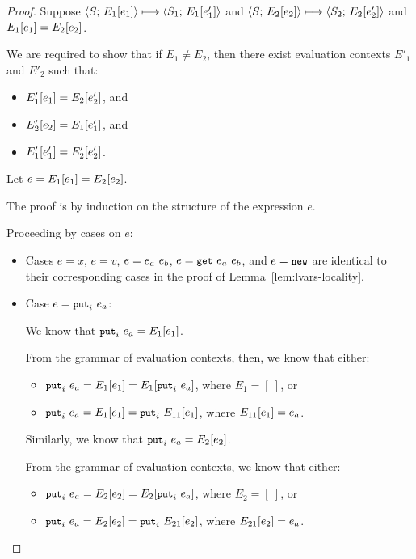 \begin{proof}
  Suppose $\langle S;\, E_1\hspace{-0.5mm}\left[e_1\right] \rangle \longmapsto
  \langle S_1;\, E_1\hspace{-0.5mm}\left[e'_1\right] \rangle$ and
  $\langle S;\, E_2\hspace{-0.5mm}\left[e_2\right] \rangle \longmapsto
  \langle S_2;\, E_2\hspace{-0.5mm}\left[e'_2\right] \rangle$ and $E_1\hspace{-0.5mm}\left[e_1\right] =
  E_2\hspace{-0.5mm}\left[e_2\right]$.

  We are required to show that if $E_1 \neq E_2$, then there exist
  evaluation contexts $E'_1$ and $E'_2$ such that:
  \begin{itemize}
  \item $E'_1\hspace{-0.5mm}\left[e_1\right] = E_2\hspace{-0.5mm}\left[e'_2\right]$, and
  \item $E'_2\hspace{-0.5mm}\left[e_2\right] = E_1\hspace{-0.5mm}\left[e'_1\right]$, and
  \item $E'_1\hspace{-0.5mm}\left[e'_1\right] = E'_2\hspace{-0.5mm}\left[e'_2\right]$.
  \end{itemize}

  Let $e = E_1\hspace{-0.5mm}\left[e_1\right] = E_2\hspace{-0.5mm}\left[e_2\right]$.

  The proof is by induction on the structure of the expression $e$.

  Proceeding by cases on $e$:

  \begin{itemize}

  \item Cases $e = x$, $e = v$, $e = e_a~e_b$, $e =
    \mbox{\small{\texttt{get}}}~e_a~e_b$, and $e = \mbox{\small{\texttt{new}}}$ are identical to their
    corresponding cases in the proof of
    Lemma~\ref{lem:lvars-locality}.

  \item Case $e = \mbox{\small{\texttt{put}}}_i~e_a$:

    We know that $\mbox{\small{\texttt{put}}}_i~e_a = E_1\hspace{-0.5mm}\left[e_1\right]$.

    From the grammar of evaluation contexts, then, we know that
    either:
    \begin{itemize}
    \item $\mbox{\small{\texttt{put}}}_i~e_a = E_1\hspace{-0.5mm}\left[e_1\right] =
      E_1\hspace{-0.5mm}\left[\mbox{\small{\texttt{put}}}_i~e_a\right]$, where $E_1 = [~]$, or
    \item $\mbox{\small{\texttt{put}}}_i~e_a = E_1\hspace{-0.5mm}\left[e_1\right] =
      \mbox{\small{\texttt{put}}}_i~E_{11}\hspace{-0.5mm}\left[e_1\right]$, where $E_{11}\hspace{-0.5mm}\left[e_1\right]
      = e_a$.
    \end{itemize}

    Similarly, we know that $\mbox{\small{\texttt{put}}}_i~e_a = E_2\hspace{-0.5mm}\left[e_2\right]$.

    From the grammar of evaluation contexts, we know that either:
    \begin{itemize}
    \item $\mbox{\small{\texttt{put}}}_i~e_a = E_2\hspace{-0.5mm}\left[e_2\right] =
      E_2\hspace{-0.5mm}\left[\mbox{\small{\texttt{put}}}_i~e_a\right]$, where $E_2 = [~]$, or
    \item $\mbox{\small{\texttt{put}}}_i~e_a = E_2\hspace{-0.5mm}\left[e_2\right] =
      \mbox{\small{\texttt{put}}}_i~E_{21}\hspace{-0.5mm}\left[e_2\right]$, where $E_{21}\hspace{-0.5mm}\left[e_2\right]
      = e_a$.
    \end{itemize}


\end{itemize}
\end{proof}
